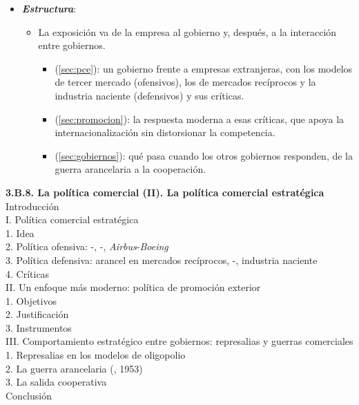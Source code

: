 \documentclass[11pt]{article}
\begin{document}
\begin{itemize}
\item \textbf{\emph{Estructura}}:
  \begin{itemize}
  \item La exposición va de la empresa al gobierno y, después, a la interacción entre gobiernos.
  \begin{itemize}
  \item {} (\ref{sec:pce}): un gobierno frente a empresas extranjeras, con los modelos de tercer mercado (ofensivos), los de mercados recíprocos y la industria naciente (defensivos) y sus críticas.
  \item {} (\ref{sec:promocion}): la respuesta moderna a esas críticas, que apoya la internacionalización sin distorsionar la competencia.
  \item {} (\ref{sec:gobiernos}): qué pasa cuando los otros gobiernos responden, de la guerra arancelaria a la cooperación.
  \end{itemize}
  \end{itemize}
\end{itemize}

\begin{esquema}
\textbf{3.B.8. La política comercial (II). La política comercial estratégica}\\[2pt]
Introducción\\
I. Política comercial estratégica\\
\hspace*{1.5em}1. Idea\\
\hspace*{1.5em}2. Política ofensiva: -, -, \emph{Airbus}-\emph{Boeing}\\
\hspace*{1.5em}3. Política defensiva: arancel en mercados recíprocos, -, industria naciente\\
\hspace*{1.5em}4. Críticas\\
II. Un enfoque más moderno: política de promoción exterior\\
\hspace*{1.5em}1. Objetivos\\
\hspace*{1.5em}2. Justificación\\
\hspace*{1.5em}3. Instrumentos\\
III. Comportamiento estratégico entre gobiernos: represalias y guerras comerciales\\
\hspace*{1.5em}1. Represalias en los modelos de oligopolio\\
\hspace*{1.5em}2. La guerra arancelaria (, 1953)\\
\hspace*{1.5em}3. La salida cooperativa\\
Conclusión
\end{esquema}
\end{document}
